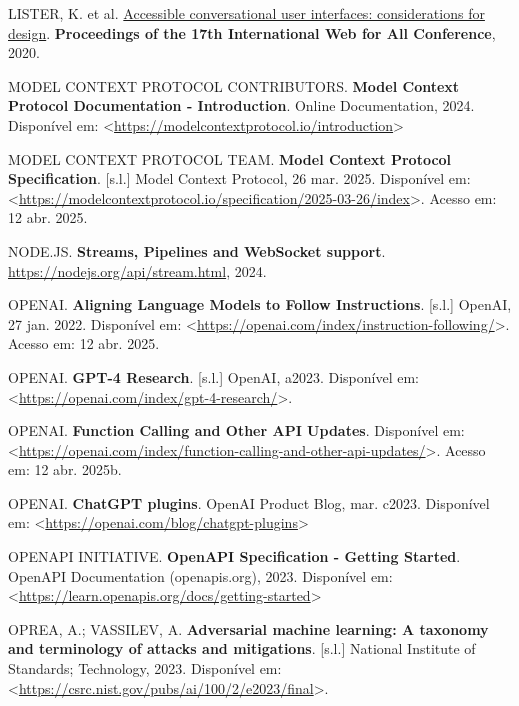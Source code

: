 \documentclass[
]{article}
\newlength{\cslhangindent}
\newenvironment{CSLReferences}[2] %
 {\begin{list}{}{%
  \setlength{\itemindent}{0pt}
  \setlength{\leftmargin}{0pt}
  \setlength{\parsep}{0pt}
  \ifodd #1
   \setlength{\leftmargin}{\cslhangindent}
   \setlength{\itemindent}{-1\cslhangindent}
  \fi
  \setlength{\itemsep}{#2\baselineskip}}}
 {\end{list}}
\begin{document}
\begin{CSLReferences}{0}{1}
LISTER, K. et al.
\href{https://api.semanticscholar.org/CorpusID:218539971}{Accessible
conversational user interfaces: considerations for design}.
\textbf{Proceedings of the 17th International Web for All Conference},
2020.

MODEL CONTEXT PROTOCOL CONTRIBUTORS. \textbf{{Model Context Protocol
Documentation - Introduction}}. Online Documentation, 2024. Disponível
em:
\textless{}\url{https://modelcontextprotocol.io/introduction}\textgreater{}

MODEL CONTEXT PROTOCOL TEAM. \textbf{Model Context Protocol
Specification}. {[}s.l.{]} Model Context Protocol, 26 mar. 2025.
Disponível em:
\textless{}\url{https://modelcontextprotocol.io/specification/2025-03-26/index}\textgreater.
Acesso em: 12 abr. 2025.

NODE.JS. \textbf{Streams, Pipelines and WebSocket support}.
\url{https://nodejs.org/api/stream.html}, 2024.

OPENAI. \textbf{Aligning Language Models to Follow Instructions}.
{[}s.l.{]} OpenAI, 27 jan. 2022. Disponível em:
\textless{}\url{https://openai.com/index/instruction-following/}\textgreater.
Acesso em: 12 abr. 2025.

OPENAI. \textbf{GPT-4 Research}. {[}s.l.{]} OpenAI, a2023. Disponível
em:
\textless{}\url{https://openai.com/index/gpt-4-research/}\textgreater.

OPENAI. \textbf{Function Calling and Other API Updates}. Disponível em:
\textless{}\url{https://openai.com/index/function-calling-and-other-api-updates/}\textgreater.
Acesso em: 12 abr. 2025b.

OPENAI. \textbf{{ChatGPT plugins}}. OpenAI Product Blog, mar. c2023.
Disponível em:
\textless{}\url{https://openai.com/blog/chatgpt-plugins}\textgreater{}

OPENAPI INITIATIVE. \textbf{{OpenAPI Specification - Getting Started}}.
OpenAPI Documentation (openapis.org), 2023. Disponível em:
\textless{}\url{https://learn.openapis.org/docs/getting-started}\textgreater{}

OPREA, A.; VASSILEV, A. \textbf{Adversarial machine learning: A taxonomy
and terminology of attacks and mitigations}. {[}s.l.{]} National
Institute of Standards; Technology, 2023. Disponível em:
\textless{}\url{https://csrc.nist.gov/pubs/ai/100/2/e2023/final}\textgreater.


\end{CSLReferences}
\end{document}
